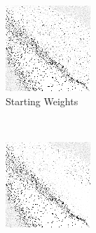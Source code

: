 
\begin{figure}
\center

	\begin{subfigure}[t]{0.2\textwidth}
	\includegraphics[width=\textwidth]{images/findings/round2/flipbook/winner/checkpoint_000000.png}
	\caption{Starting Weights}
	\end{subfigure}
	~
	\begin{subfigure}[t]{0.2\textwidth}
	\includegraphics[width=\textwidth]{images/findings/round2/flipbook/winner/checkpoint_200000.png}

\end{subfigure}
\end{figure}
